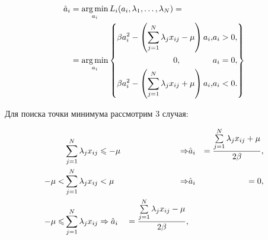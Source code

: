 \begin{equation}
	\label{hatAi}
	\begin{split}
		\hat a_i &= \mathop{\mbox{arg\ \!min}}\limits_{a_i} L_i(a_i,\lambda_{1},\ldots,\lambda_{N}) = \\
				 &=	\mathop{\mbox{arg\ \!min}}\limits_{a_i} \left\{
				 	\begin{aligned}
						\beta a_i^2 - \left(\sum\limits_{j=1}^N\lambda_jx_{ij}-\mu\right)a_i, &a_i > 0,\\
						0, \qquad\qquad &a_i = 0,\\
						\beta a_i^2 - \left(\sum\limits_{j=1}^N\lambda_jx_{ij}+\mu\right)a_i, &a_i < 0.\\
					\end{aligned}	
					\right\}
	\end{split}
\end{equation}

Для поиска точки минимума рассмотрим 3 случая:

\begin{align}
	\label{hatAi}
	         &\sum\limits_{j=1}^N\lambda_jx_{ij} \leqslant -\mu &\Rightarrow& \hat a_i &= \frac{\sum\limits_{j=1}^N\lambda_jx_{ij}+\mu}{2\beta}, \\
	-\mu <   &\sum\limits_{j=1}^N\lambda_jx_{ij} < \mu 	&\Rightarrow &\hat a_i &= 0, \\
	-\mu \leqslant &\sum\limits_{j=1}^N\lambda_jx_{ij} 			\Rightarrow \hat a_i &= \frac{\sum\limits_{j=1}^N\lambda_jx_{ij}-\mu}{2\beta},
\end{align}
